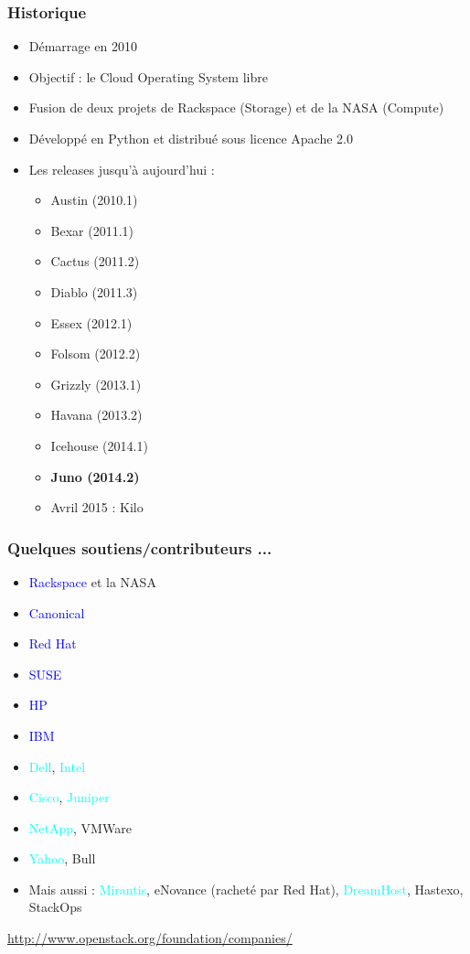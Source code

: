   \begin{frame}
    \frametitle{Historique}
    \begin{itemize}
      \item Démarrage en 2010
      \item Objectif : le Cloud Operating System libre
      \item Fusion de deux projets de Rackspace (Storage) et de la NASA (Compute)
      \item Développé en Python et distribué sous licence Apache 2.0\pause
      \item Les releases jusqu'à aujourd'hui :
      \begin{itemize}
        \item Austin (2010.1)
        \item Bexar (2011.1)
        \item Cactus (2011.2)
        \item Diablo (2011.3)
        \item Essex (2012.1)
        \item Folsom (2012.2)
        \item Grizzly (2013.1)
        \item Havana (2013.2)
        \item Icehouse (2014.1)
        \item \textbf{Juno (2014.2)}\pause
        \item Avril 2015 : Kilo
      \end{itemize}
    \end{itemize}
  \end{frame}

  \begin{frame}
    \frametitle{Quelques soutiens/contributeurs ...}
    \begin{itemize}
      \item \textcolor{blue}{Rackspace} et la NASA\pause
      \item \textcolor{blue}{Canonical}
      \item \textcolor{blue}{Red Hat}
      \item \textcolor{blue}{SUSE}\pause
      \item \textcolor{blue}{HP}
      \item \textcolor{blue}{IBM}
      \item \textcolor{cyan}{Dell}, \textcolor{cyan}{Intel}
      \item \textcolor{cyan}{Cisco}, \textcolor{cyan}{Juniper}\pause
      \item \textcolor{cyan}{NetApp}, VMWare\pause
      \item \textcolor{cyan}{Yahoo}, Bull\pause
      \item Mais aussi : \textcolor{cyan}{Mirantis}, eNovance (racheté par Red Hat), \textcolor{cyan}{DreamHost}, Hastexo, StackOps\pause
    \end{itemize}
    \url{http://www.openstack.org/foundation/companies/}
  \end{frame}

